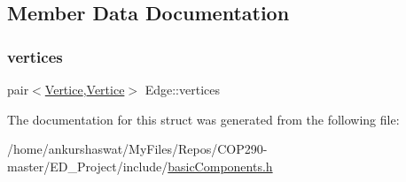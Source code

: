 \subsection{Member Data Documentation}
\mbox{\label{structEdge_adb182142702f93f85a3f41c86f4916ff}} 
\subsubsection{\texorpdfstring{vertices}{vertices}}
{\footnotesize\ttfamily pair$<$\hyperlink{structVertice}{Vertice},\hyperlink{structVertice}{Vertice}$>$ Edge\+::vertices}



The documentation for this struct was generated from the following file\+:\begin{DoxyCompactItemize}
\item 
/home/ankurshaswat/\+My\+Files/\+Repos/\+C\+O\+P290-\/master/\+E\+D\+\_\+\+Project/include/\hyperlink{basicComponents_8h}{basic\+Components.\+h}\end{DoxyCompactItemize}
